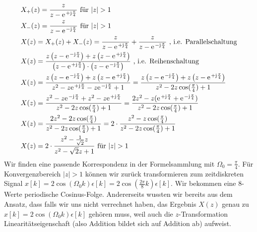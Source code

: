 \begin{ExCalc}
\begin{align}
&X_+(z) = \frac{z}{z-\e^{+\im\frac{\pi}{4}}}\text{ für } |z|>1 \\
&X_-(z) = \frac{z}{z-\e^{-\im\frac{\pi}{4}}}\text{ für } |z|>1 \\
&X(z) = X_+(z) + X_-(z) = \frac{z}{z-\e^{+\im\frac{\pi}{4}}} + \frac{z}{z-\e^{-\im\frac{\pi}{4}}}\text{ , i.e. Parallelschaltung}\\
&X(z) = \frac{z \left(z-\e^{-\im\frac{\pi}{4}}\right) + z \left(z-\e^{+\im\frac{\pi}{4}}\right)}
{\left(z-\e^{+\im\frac{\pi}{4}}\right)\cdot \left(z-\e^{-\im\frac{\pi}{4}}\right)}\text{ , i.e. Reihenschaltung}\\
&X(z)  = \frac{z \left(z-\e^{-\im\frac{\pi}{4}}\right) + z \left(z-\e^{+\im\frac{\pi}{4}}\right)}
{z^2 - z \e^{+\im\frac{\pi}{4}} - z \e^{-\im\frac{\pi}{4}} + 1}=
\frac{z \left(z-\e^{-\im\frac{\pi}{4}}\right) + z \left(z-\e^{+\im\frac{\pi}{4}}\right)}
{z^2 - 2 z \cos(\frac{\pi}{4}) + 1}\\
&X(z) = \frac{z^2 - z \e^{-\im\frac{\pi}{4}} + z^2 - z \e^{+\im\frac{\pi}{4}}}
{z^2 - 2 z \cos(\frac{\pi}{4}) + 1} =
\frac{2 z^2 - z (\e^{+\im\frac{\pi}{4}} + \e^{-\im\frac{\pi}{4}} )}
{z^2 - 2 z \cos(\frac{\pi}{4}) + 1}\\
&X(z) =\frac{2 z^2 - 2 z \cos(\frac{\pi}{4})}{z^2 - 2 z \cos(\frac{\pi}{4}) + 1}=
2 \cdot \frac{z^2 - z \cos(\frac{\pi}{4})}{z^2 - 2 z \cos(\frac{\pi}{4}) + 1}\\
&X(z) = 2 \cdot \frac{z^2-\frac{1}{\sqrt{2}} z}{z^2-\sqrt{2} z +1}\text{ für } |z|>1
\end{align}
%
Wir finden eine passende Korrespondenz in der Formelsammlung mit
$\Omega_0=\frac{\pi}{4}$. Für Konvergenzbereich $|z|>1$ können wir
zurück transformieren zum zeitdiskreten Signal
$x[k] = 2\cos(\Omega_0 k) \epsilon[k] = 2 \cos(\frac{2\pi}{8} k) \epsilon[k]$.
Wir bekommen eine 8-Werte periodische Cosinus-Folge.
%
Andererseits wussten wir bereits aus dem Ansatz, dass falls wir uns nicht
verrechnet haben, das Ergebnis $X(z)$ genau zu
$x[k] = 2\cos(\Omega_0 k) \epsilon[k]$ gehören muss,
weil auch die $z$-Transformation Linearitätseigenschaft (also Addition bildet sich
auf Addition ab) aufweist.


\end{ExCalc}
